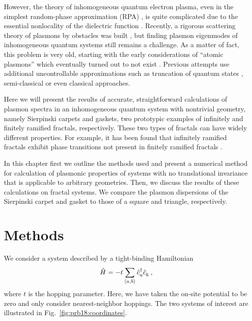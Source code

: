 However, the theory of inhomogeneous quantum electron plasma, even in the simplest random-phase approximation (RPA) \cite{nozieres1999theory, platzman1973waves,Vonsov2012QuantumSolidS, giuliani2005quantum}, is quite complicated due to the essential nonlocality of the dielectric function \cite{Vonsov2012QuantumSolidS}. Recently, a rigorous scattering theory of plasmons by obstacles was built \cite{torre2017lippmann}, but finding plasmon eigenmodes of inhomogeneous quantum systems still remains a challenge.  As a matter of fact, this problem is very old, starting with the early considerations \cite{bloch1933bremsvermogen, jensen1937eigenschwingungen} of ``atomic plasmons'' \cite{kh1971ishmukhametov, sen1973spectrum, gadiyak1975collective, ishmukhametov1975collective, amusia1978existence} which eventually turned out to not exist \cite{verkhovtseva1976concerning, ishmukhametov1981existence}. Previous attempts use additional uncontrollable approximations such as truncation of quantum states \cite{amusia1978existence}, semi-classical \cite{kh1971ishmukhametov, ishmukhametov1975collective, ishmukhametov1981existence} or even classical \cite{gadiyak1975collective} approaches.

Here we will present the results of accurate, straightforward calculations of plasmon spectra in an inhomogeneous quantum system with nontrivial geometry, namely Sierpinski carpets and gaskets, two prototypic examples of infinitely and finitely ramified fractals, respectively. These two types of fractals can have widely different properties. For example, it has been found that infinitely ramified fractals exhibit phase transitions not present in finitely ramified fractals \cite{gefen1984phase}.

In this chapter first we outline the methods used and present a numerical method for calculation of plasmonic properties of systems with no translational invariance that is applicable to arbitrary geometries. Then, we discuss the results of these calculations on fractal systems. We compare the plasmon dispersions of the Sierpinski carpet and gasket to those of a square and triangle, respectively.

\section{Methods}

We consider a system described by a tight-binding Hamiltonian
\begin{equation}
    \hat H = - t \sum_{\langle a,b \rangle} \hat c^{\dagger}_{a \vphantom{b}}
    \hat c^{\vphantom{\dagger}}_b \;,
\end{equation}
where $t$ is the hopping parameter. Here, we have taken the on-site potential to be zero and only consider nearest-neighbor hoppings. The two systems of interest are illustrated in Fig.~\ref{fig:prb18:coordinates}.

